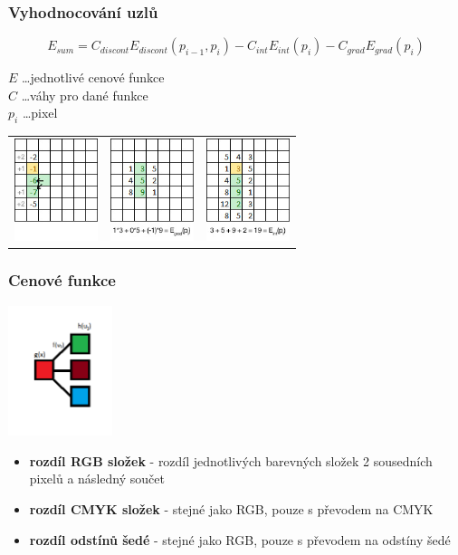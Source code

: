 \documentclass{beamer}
\begin{document}
	\begin{frame}[t,fragile]
		\frametitle{Vyhodnocování uzlů}	

		$$ E_{sum} = C_{discont}E_{discont}(p_{i-1},p_{i})-C_{int}E_{int}(p_{i})-C_{grad}E_{grad}(p_{i}) $$
		
		$E$ \ldots jednotlivé cenové funkce \\
		$C$ \ldots váhy pro dané funkce \\
		$p_{i}$ \ldots pixel
		
		\vspace{5mm}\centering
		\begin{tabular}{lll}
			\vspace{-5mm}\includegraphics[height=30mm]{disc.jpg} &		
			\includegraphics[height=30mm]{grad.jpg} &
			\includegraphics[height=30mm]{int.jpg}
		\end{tabular}
		

	\end{frame}
	
	\begin{frame}[t,fragile]
		\frametitle{Cenové funkce}	
\centering	\includegraphics[height=38mm]{cenovefce.png}
\vspace{-5mm}
	\begin{itemize}
		\item \textbf{rozdíl RGB složek} - rozdíl jednotlivých barevných složek 2 sousedních pixelů a následný součet
		\item \textbf{rozdíl CMYK složek} - stejné jako RGB, pouze s převodem na CMYK
		\item \textbf{rozdíl odstínů šedé} - stejné jako RGB, pouze s převodem na odstíny šedé
	\end{itemize}
		
	\end{frame}
	
\end{document}
